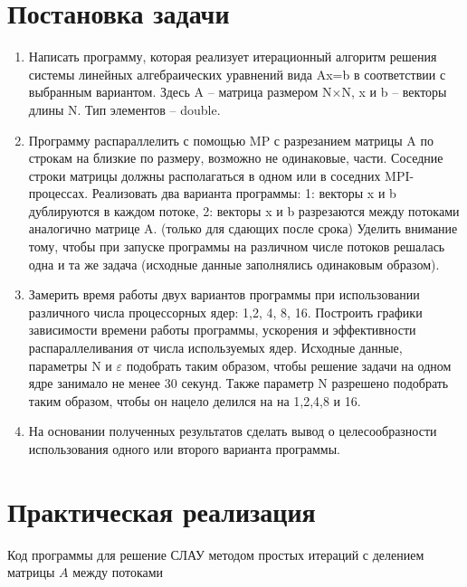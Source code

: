 \documentclass[a4paper, 14pt]{extarticle}
\begin{document}
\newpage

\tableofcontents

\newpage

\section{Постановка задачи}

\begin{enumerate}
	\item{Написать программу, которая реализует итерационный алгоритм
		решения системы линейных алгебраических уравнений вида Ax=b в
		соответствии с выбранным вариантом. Здесь A – матрица размером
		N×N, x и b – векторы длины N. Тип элементов – double.
		}

	\item{
		Программу распараллелить с помощью MP с разрезанием матрицы A
		по строкам на близкие по размеру, возможно не одинаковые, части.
		Соседние строки матрицы должны располагаться в одном или в
		соседних MPI-процессах. Реализовать два варианта программы:
		1: векторы x и b дублируются в каждом потоке,
		2: векторы x и b разрезаются между потоками аналогично
		матрице A. (только для сдающих после срока)
		Уделить внимание тому, чтобы при запуске программы на различном
		числе потоков решалась одна и та же задача (исходные данные
		заполнялись одинаковым образом).
		}
		
	\item{Замерить время работы двух вариантов программы при использовании
		различного числа процессорных ядер: 1,2, 4, 8, 16. Построить графики
		зависимости времени работы программы, ускорения и эффективности
		распараллеливания от числа используемых ядер. Исходные данные,
		параметры N и $\varepsilon$ подобрать таким образом, чтобы решение задачи на
		одном ядре занимало не менее 30 секунд. Также параметр N разрешено
		подобрать таким образом, чтобы он нацело делился на на 1,2,4,8 и 16.
		}

	\item{На основании полученных результатов сделать вывод о
		целесообразности использования одного или второго варианта
		программы.
		}
\end{enumerate}


\newpage

\section{Практическая реализация}


Код программы для решение СЛАУ методом простых итераций с делением матрицы $A$ между потоками  
\end{document}
